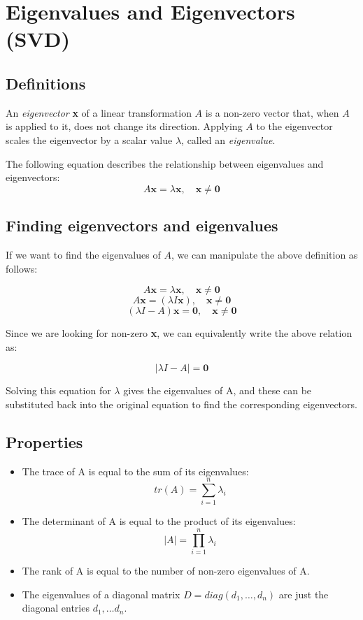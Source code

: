 \documentclass{article}
\begin{document}
\section{Eigenvalues and Eigenvectors (SVD)}

\subsection{Definitions}
An \textit{eigenvector} \textbf{x} of a linear transformation $A$ is a non-zero vector that, when $A$ is applied to it, does not change its direction.
Applying $A$ to the eigenvector scales the eigenvector by a scalar value $\lambda$, called an \textit{eigenvalue}.

The following equation describes the relationship between eigenvalues and eigenvectors:
$$A\mathbf{x}=\lambda \mathbf{x}, \quad \mathbf{x}\neq \mathbf{0}$$

\subsection{Finding eigenvectors and eigenvalues}
If we want to find the eigenvalues of $A$, we can manipulate the above definition as follows:

$$A\mathbf{x}=\lambda \mathbf{x}, \quad \mathbf{x}\neq \mathbf{0}$$
$$A\mathbf{x}=(\lambda I \mathbf{x}), \quad \mathbf{x}\neq \mathbf{0}$$
$$(\lambda I-A)\mathbf{x}=\mathbf{0}, \quad \mathbf{x}\neq \mathbf{0}$$

Since we are looking for non-zero \textbf{x}, we can equivalently write the above relation as:

$$|\lambda I-A|=\mathbf{0}$$

Solving this equation for $\lambda$ gives the eigenvalues of A, and these can be substituted back into the original equation to find the corresponding eigenvectors.

\subsection{Properties}
\begin{itemize}
\item The trace of A is equal to the sum of its eigenvalues:
$$tr(A)=\sum_{i=1}^{n} \lambda_i$$
\item The determinant of A is equal to the product of its eigenvalues:
$$|A|=\prod_{i=1}^{n} \lambda_i$$
\item The rank of A is equal to the number of non-zero eigenvalues of A.
\item The eigenvalues of a diagonal matrix $D = diag(d_1, \ldots, d_n)$ are just the diagonal entries $d_1, \ldots d_n$.
\end{itemize}
\end{document}
